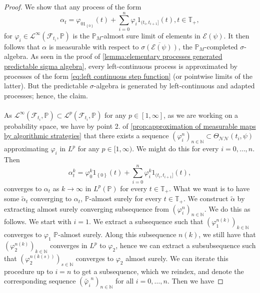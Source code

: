 \documentclass[11pt,a4paper,twoside,openany]{report}
\theoremstyle{plain} %
\theoremstyle{definition} %
\theoremstyle{remark} %
\begin{document}
\begin{proof}
    We show that any process of the form 
    \begin{equation}\label{eq:left continuous step function}
        \alpha_t = \varphi_01_{\left\{ 0\right\}}(t)+\sum_{i=0}^n \varphi_i1_{(t_i,t_{i+1}]}(t),t\in\mathbb{T}_+,
    \end{equation}
    for \(\varphi_i\in\mathcal{L}^{\infty}(\mathcal{F}_{t_i},\mathbb{P})\) 
    is the \(\mathbb{P}_M\)-almost sure limit of elements in \(\mathcal{E}(\psi)\). It then follows that \(\alpha\) is measurable with respect to \(\overline{\sigma(\mathcal{E}(\psi))}\), the \(\mathbb{P}_M\)-completed \(\sigma\)-algebra. As seen in the proof of \cref{lemma:elementary processes generated predictable sigma algebra}, every left-continuous process is approximated by processes of the form \cref{eq:left continuous step function} (or pointwise limits of the latter). But the predictable \(\sigma\)-algebra is generated by left-continuous and adapted processes; hence, the claim.
    \\\\ 
    As \(\mathcal{L}^{\infty}(\mathcal{F}_{t_i},\mathbb{P})\subset \mathcal{L}^p(\mathcal{F}_{t_i},\mathbb{P})\) for any \(p\in[1,\infty]\), as we are working on a probability space, we have by point 2.  of \cref{prop:approximation of measurable maps by algorithmic strategies} that there exists a sequence \((\varphi_i^n)_{n\in\mathbb{N}}\subset\Theta_{\mathcal{NN}}(t_i,\psi)\) approximating \(\varphi_i\) in \(L^p\) for any \(p\in[1,\infty)\). 
    We might do this for every \(i=0,\dots, n\). Then 
    \begin{equation}
        \alpha_t^k=\varphi_0^k1_{\left\{ 0\right\}}(t)+\sum_{i=0}^n \varphi_i^k1_{(t_i,t_{i+1}]}(t),
    \end{equation}
    converges to \(\alpha_t\) as \(k\to\infty\) in \(L^p(\mathbb{P})\) for every \(t\in\mathbb{T}_+\). What we want is to have some \(\widetilde{\alpha}_t\) converging to \(\alpha_t\), \(\mathbb{P}\)-almost surely for every \(t\in\mathbb{T}_+\). We construct \(\widetilde{\alpha}\) by extracting almost surely converging subsequence from \((\varphi_i^n)_{n\in\mathbb{N}}\). We do this as follows.
    We start with \(i=1\). We extract a subsequence such that \((\varphi_1^{n(k)})_{k\in\mathbb{N}}\) converges to \(\varphi_1\) \(\mathbb{P}\)-almost surely. Along this subsequence \(n(k)\), we still have that \((\varphi_{2}^{n(k)})_{k\in\mathbb{N}}\) converges in \(L^p\) to \(\varphi_2\), hence we can extract a subsubsequence such that \((\varphi_{2}^{n(k(s))})_{s\in\mathbb{N}}\) converges to \(\varphi_2\) almost surely. We can iterate this procedure up to \(i=n\) to get a subsequence, which we reindex, and denote the corresponding sequence \((\widetilde{\varphi_i}^n)_{n\in\mathbb{N}}\) for all \(i=0,\dots,n\). Then we have 

\end{proof}
\end{document}
